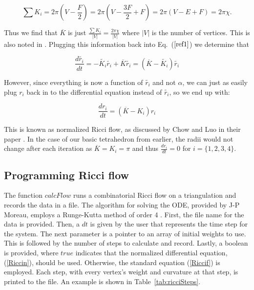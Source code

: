 \documentclass[12pt]{article}
\begin{document}
$$\sum{K_i} = 2\pi(V - \frac{F}{2}) = 2\pi(V - \frac{3F}{2} + F) = 2\pi(V - E + F) = 2\pi \chi.$$

\noindent Thus we find that $\overline{K}$ is just $\displaystyle\frac{\sum{K_i}}{|V|} = \frac{2\pi \chi}{|V|}$ where $|V|$ is the number of vertices. This is also noted in \cite{chowluo}. Plugging this information back into Eq.~($\ref{ref1}$) we determine that

\begin{equation}
\frac{d\tilde{r_i}}{dt} = -\tilde{K_i}\tilde{r_i} + \overline{K}\tilde{r_i} = (\overline{K} - \tilde{K_i})\tilde{r_i}
\end{equation}

\noindent However, since everything is now a function of $\tilde{r_i}$ and not $\alpha$, we can just as easily plug $r_i$ back in to the differential equation instead of $\tilde{r_i}$, so we end up with:

\begin{equation}
\label{Riccin}
\frac{dr_i}{dt} = (\overline{K} - K_i)r_i
\end{equation}

\noindent This is known as normalized Ricci flow, as discussed by Chow and Luo in their paper \cite{chowluo}. In the case of our basic tetrahedron from earlier, the radii would not change after each iteration as $\overline{K} = K_i = \pi$ and thus $\displaystyle\frac{dr_i}{dt} = 0$ for $i = \{1,2,3,4\}$. 

\subsection{Programming Ricci flow}
\noindent The function $calcFlow$ runs a combinatorial Ricci flow on a triangulation and records the data in a file. The algorithm for solving the ODE, provided by J-P Moreau, employs a Runge-Kutta method of order 4 \cite{JPM}. First, the file name for the data is provided. Then, a $dt$ is given by the user that represents the time step for the system. The next parameter is a pointer to an array of initial weights to use. This is followed by the number of steps to calculate and record. Lastly, a boolean is provided, where $true$ indicates that the normalized differential equation, (\ref{Riccin}), should be used. Otherwise, the standard equation (\ref{Riccif}) is employed. Each step, with every vertex's weight and curvature at that step, is printed to the file. An example is shown in Table~\ref{tab:ricciSteps}.\newline
\end{document}
